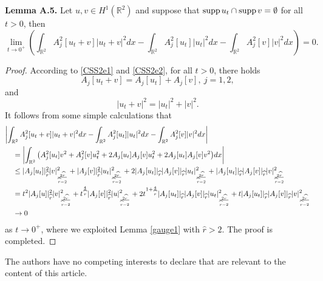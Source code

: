 \documentclass[11pt]{amsart}
\numberwithin{equation}{section}
\theoremstyle{definition}
\newcommand{\R}{\mathbb{R}}
\newcommand{\supp}{{\rm supp}{\hspace{.05cm}}}
\begin{document}
\noindent \textbf{Lemma A.5.} Let $u,v\in H^1(\R^2)$ and suppose
 that $\supp u_t \cap \supp v=\emptyset$ for all $t>0$,
 then
 \[
 \lim_{t\to0^+}\left(\int_{\R^2}A_j^2[u_t+v]|u_t+v|^2dx-\int_{\R^2}A_j^2[u_t]|u_t|^2dx
 - \int_{\R^2}A_j^2[ v]| v|^2dx\right)=0.
 \]


 \begin{proof}
 According to \eqref{CSS2e1} and \eqref{CSS2e2}, for all $t>0$, there holds
 \[
 A_j[u_t+v]=A_j[u_t]+A_j[v],~j=1,2,
 \]
 and
 \[
 |u_t+v|^2=|u_t|^2+|v|^2.
 \]
 It follows from some simple calculations that
 \[\begin{gathered}
 \left|\int_{\R^2}A_j^2[u_t+v]|u_t+v|^2dx-\int_{\R^2}A_j^2[u_t]|u_t|^2dx
 - \int_{\R^2}A_j^2[ v]| v|^2dx\right|
 \hfill\\
 \ \ \ \  = \left|\int_{\R^2}\big(A_j^2[u_t]v^2+A_j^2[v]u_t^2+2A_j[u_t]A_j[v]u_t^2+2A_j[u_t]A_j[v]v^2\big)dx\right| \hfill\\
 \ \ \ \  \leq |A_j[u_t]|_{\widehat{r}}^2 |v|_{\frac{2\widehat{r}}{\widehat{r}-2}}^{2}
 +|A_j[v]|_{\widehat{r}}^2 |u_t|_{\frac{2\widehat{r}}{\widehat{r}-2}}^{2}
 +2 |A_j[u_t]|_{\widehat{r}} |A_j[v]|_{\widehat{r}} |u_t|_{\frac{2\widehat{r}}{\widehat{r}-2}}^{2}
 +|A_j[u_t]|_{\widehat{r}}|A_j[v]|_{\widehat{r}} |v|_{\frac{2\widehat{r}}{\widehat{r}-2}}^{2} \hfill\\
 \ \ \ \  =t^2|A_j[u]|_{\widehat{r}}^2 |v|_{\frac{2\widehat{r}}{\widehat{r}-2}}^{2}
 +t^{\frac4{\widehat{r}}}|A_j[v]|_{\widehat{r}}^2 |u |_{\frac{2\widehat{r}}{\widehat{r}-2}}^{2}
 +2t^{1+\frac4{\widehat{r}}} |A_j[u_t]|_{\widehat{r}} |A_j[v]|_{\widehat{r}} |u_t|_{\frac{2\widehat{r}}{\widehat{r}-2}}^{2}
 +t|A_j[u_t]|_{\widehat{r}}|A_j[v]|_{\widehat{r}} |v|_{\frac{2\widehat{r}}{\widehat{r}-2}}^{2} \hfill\\
 \ \ \ \   \to0 \hfill\\
 \end{gathered}
 \]
 as $t\to0^+$, where we exploited Lemma \ref{gauge1} with $\widehat{r}>2$. The proof is completed.
 \end{proof}




\vskip18pt

\par{} The authors have no competing
interests to declare that are relevant to the content of this
article. \vskip0.1in
\end{document}

